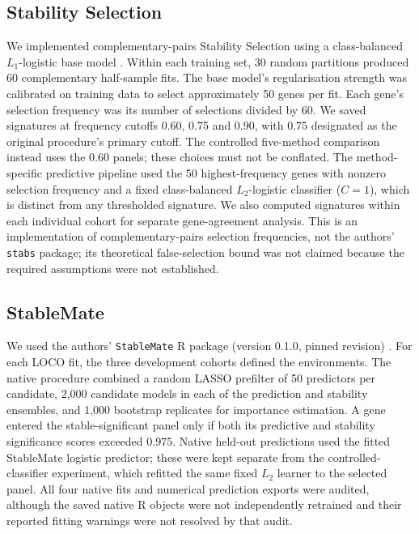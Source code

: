 \subsection{Stability Selection}
\label{sec:stability_method}
We implemented complementary-pairs Stability Selection using a class-balanced $L_1$-logistic base model \cite{meinshausen2010stability}. Within each training set, 30 random partitions produced 60 complementary half-sample fits. The base model's regularisation strength was calibrated on training data to select approximately 50 genes per fit. Each gene's selection frequency was its number of selections divided by 60. We saved signatures at frequency cutoffs 0.60, 0.75 and 0.90, with 0.75 designated as the original procedure's primary cutoff. The controlled five-method comparison instead uses the 0.60 panels; these choices must not be conflated. The method-specific predictive pipeline used the 50 highest-frequency genes with nonzero selection frequency and a fixed class-balanced $L_2$-logistic classifier ($C=1$), which is distinct from any thresholded signature. We also computed signatures within each individual cohort for separate gene-agreement analysis. This is an implementation of complementary-pairs selection frequencies, not the authors' \texttt{stabs} package; its theoretical false-selection bound was not claimed because the required assumptions were not established.

\subsection{StableMate}
\label{sec:stablemate_method}
We used the authors' \texttt{StableMate} R package (version 0.1.0, pinned revision) \cite{deng2024stablemate}. For each LOCO fit, the three development cohorts defined the environments. The native procedure combined a random LASSO prefilter of 50 predictors per candidate, 2,000 candidate models in each of the prediction and stability ensembles, and 1,000 bootstrap replicates for importance estimation. A gene entered the stable-significant panel only if both its predictive and stability significance scores exceeded 0.975. Native held-out predictions used the fitted StableMate logistic predictor; these were kept separate from the controlled-classifier experiment, which refitted the same fixed $L_2$ learner to the selected panel. All four native fits and numerical prediction exports were audited, although the saved native R objects were not independently retrained and their reported fitting warnings were not resolved by that audit.

